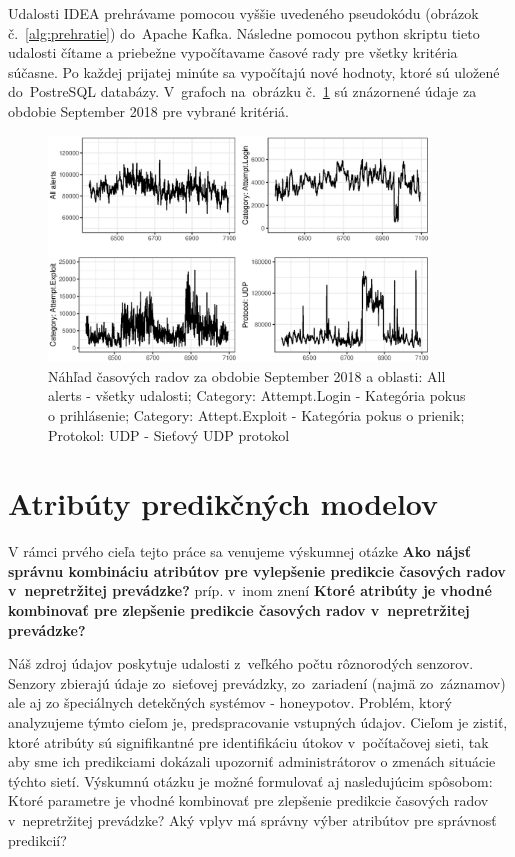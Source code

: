 \documentclass[thesismargins, thesislinespacing, openright, upjsfrontpage]{rnthesis}
\begin{document}
Udalosti IDEA prehrávame pomocou vyššie uvedeného pseudokódu (obrázok č.~\ref{alg:prehratie}) do~Apache Kafka. Následne pomocou python skriptu tieto udalosti čítame a priebežne vypočítavame časové rady pre všetky kritéria súčasne. Po každej prijatej minúte sa vypočítajú nové hodnoty, ktoré sú uložené do~PostreSQL databázy. V~grafoch na~obrázku č.~\ref{fig:timeseries_example} sú znázornené údaje za obdobie September 2018 pre vybrané kritériá.

\begin{figure}[h]
  \centering
  \includegraphics[width=0.9\textwidth]{images/TestFig3.eps}
  \caption{Náhľad časových radov za obdobie September 2018 a oblasti: All alerts - všetky udalosti; Category: Attempt.Login - Kategória pokus o prihlásenie; Category: Attept.Exploit - Kategória pokus o prienik; Protokol: UDP - Sieťový UDP protokol}
  \label{fig:timeseries_example}
\end{figure}

\section{Atribúty predikčných modelov}
V rámci prvého cieľa tejto práce sa venujeme výskumnej otázke \textbf{Ako nájsť správnu kombináciu atribútov pre vylepšenie predikcie časových radov v~nepretržitej prevádzke?} príp. v~inom znení \textbf{Ktoré atribúty je vhodné kombinovať pre zlepšenie predikcie časových radov v~nepretržitej prevádzke?}

Náš zdroj údajov poskytuje udalosti z~veľkého počtu rôznorodých senzorov. Senzory zbierajú údaje zo~sieťovej prevádzky, zo~zariadení (najmä zo~záznamov) ale aj zo špeciálnych detekčných systémov - honeypotov. Problém, ktorý analyzujeme týmto cieľom je, predspracovanie vstupných údajov. Cieľom je zistiť, ktoré atribúty sú signifikantné pre identifikáciu útokov v~počítačovej sieti, tak aby sme ich predikciami dokázali upozorniť administrátorov o zmenách situácie týchto sietí. Výskumnú otázku je možné formulovať aj nasledujúcim spôsobom: Ktoré parametre je vhodné kombinovať pre zlepšenie predikcie časových radov v~nepretržitej prevádzke? Aký vplyv má správny výber atribútov pre správnosť predikcií?
\end{document}

